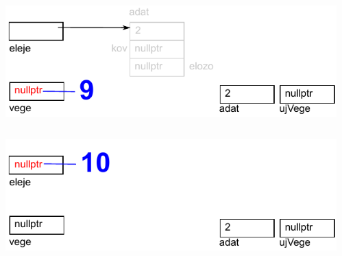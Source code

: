 \begin{frame}
  \begin{columns}[c]
      \scriptsize
      \begin{exampleblock}{}
        \scriptsize
        
      \end{exampleblock}
      \includegraphics[width=\textwidth]{sor/sor28.pdf}
  \end{columns}
\end{frame}

\begin{frame}
  \begin{columns}[c]
      \scriptsize
      \begin{exampleblock}{}
        \scriptsize
        
      \end{exampleblock}
      \includegraphics[width=\textwidth]{sor/sor29.pdf}
  \end{columns}
\end{frame}